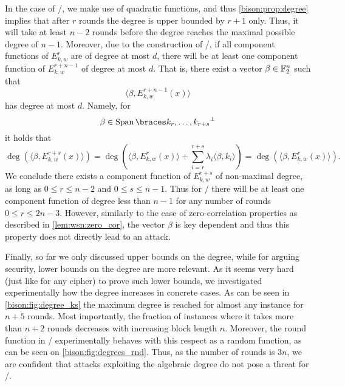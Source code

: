 In the case of \bison/, we make use of quadratic functions, and thus \cref{bison:prop:degree} implies that after $r$ rounds the degree is upper bounded by $r+1$ only.
Thus, it will take at least $n-2$ rounds before the degree reaches the maximal possible degree of $n-1$. Moreover, due to the construction of \WSN/,
if all component functions of $E_{k,w}^r$ are of degree at most $d$, there will be at least one component function of $E_{k,w}^{r+n-1}$ of degree at most $d$.
That is, there exist a vector $\beta\in\mathbb{F}_2^n$ such that
\begin{equation*}
    \langle \beta, E_{k,w}^{r+n-1}(x) \rangle
\end{equation*}
has degree at most $d$.
Namely, for
\begin{equation*}
    \beta \in \Span{k_r, \dots, k_{r+s}}^{\perp}
\end{equation*}
it holds that
\begin{equation*}
    \deg\left(\langle \beta, E_{k,w}^{r+s}(x) \rangle \right)=\deg\left(\langle \beta, E_{k,w}^r(x) \rangle + \sum_{i=r}^{r+s} \lambda_i \langle \beta,  k_i \rangle\right) = \deg\left(\langle \beta, E_{k,w}^r(x) \rangle\right).
\end{equation*}
We conclude there exists a component function of $E_{k,w}^{r+s}$ of non-maximal degree, as long as $0 \leqslant r \leqslant n-2$ and $0\leqslant s \leqslant n-1$.
Thus for \bison/ there will be at least one component function of degree less than $n-1$ for any number of rounds $0\leqslant r\leqslant 2n-3$.
However, similarly to the case of zero-correlation properties as described in \cref{lem:wsn:zero_cor}, the vector $\beta$ is key dependent and thus this property does not directly lead to an attack.

Finally, so far we only discussed upper bounds on the degree, while for arguing security, lower bounds on the degree are more relevant.
As it seems very hard (just like for any cipher) to prove such lower bounds, we investigated experimentally how the degree increases in concrete cases.
As can be seen in \cref{bison:fig:degree_ks} the maximum degree is reached for almost any instance for $n+5$ rounds.
Most importantly, the fraction of instances where it takes more than $n+2$ rounds decreases with increasing block length $n$.
Moreover, the round function in \bison/ experimentally behaves with this respect as a random function, as can be seen on \cref{bison:fig:degrees_rnd}.
Thus, as the number of rounds is $3n$, we are confident that attacks exploiting the algebraic degree do not pose a threat for \bison/.

